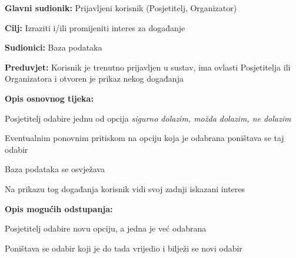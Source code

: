 	
	
	\noindent {}
	\begin{packed_item}
		
		\item \textbf{Glavni sudionik:} Prijavljeni korisnik (Posjetitelj, Organizator)
		\item  \textbf{Cilj:} Izraziti i/ili promijeniti interes za događanje
		\item  \textbf{Sudionici:} Baza podataka
		\item  \textbf{Preduvjet:} Korisnik je trenutno prijavljen u sustav, ima ovlasti Posjetitelja ili Organizatora i otvoren je  prikaz nekog događanja 
		\item  \textbf{Opis osnovnog tijeka:}
		
		\item[] \begin{packed_enum}
			
			\item Posjetitelj odabire jednu od opcija \textit{sigurno dolazim, možda dolazim, ne dolazim }
			\item Eventualnim ponovnim pritiskom na opciju koja je odabrana poništava se taj odabir
			\item Baza podataka se osvježava
			\item Na prikazu tog događanja korisnik vidi svoj zadnji iskazani interes 
			
		\end{packed_enum}
		
		\item  \textbf{Opis mogućih odstupanja:}
		
		\item[] \begin{packed_item}
			
			\item[1.a] Posjetitelj odabire novu opciju, a jedna je već odabrana  
			\item[] \begin{packed_enum}
				
				\item Poništava se odabir koji je do tada vrijedio i bilježi se novi odabir
				
			\end{packed_enum}		
		\end{packed_item}
		
	\end{packed_item}
	
